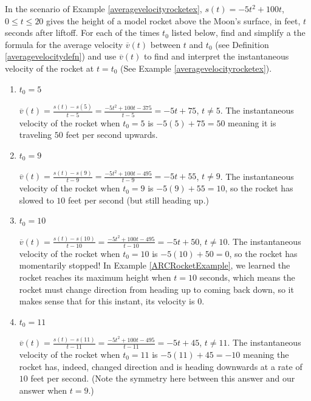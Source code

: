 \documentclass{ximera}
\begin{document}
\begin{problem}
In the scenario of  Example \ref{averagevelocityrocketex}, $s(t) = -5t^2+100t$, $0 \leq t \leq 20$ gives the height of a model rocket above the Moon's surface, in feet,  $t$ seconds after liftoff.  For each of the times $t_{0}$ listed below, find and simplify a the formula for the average velocity $\overline{v}(t)$ between $t$ and $t_{0}$ (see Definition \ref{averagevelocitydefn}) and use $\overline{v}(t)$ to find and interpret the instantaneous velocity of the rocket at $t = t_{0}$ (See Example \ref{averagevelocityrocketex}).

\begin{enumerate}

\item  $t_{0} = 5$

\begin{solution}
    $\overline{v}(t) = \frac{s(t) - s(5)}{t - 5} = \frac{-5t^2+100t-375}{t-5} = -5t+75$, $t \neq 5$.  The instantaneous velocity of the rocket when $t_{0} = 5$ is $-5(5)+75 = 50$ meaning it is traveling $50$ feet per second upwards.
\end{solution}

\item $t_{0} = 9$

\begin{solution}
    $\overline{v}(t) = \frac{s(t) - s(9)}{t - 9} = \frac{-5t^2+100t-495}{t-9} = -5t+55$, $t \neq 9$.  The instantaneous velocity of the rocket when $t_{0} = 9$ is $-5(9)+55 = 10$, so the rocket has slowed to $10$ feet per second (but still heading up.)
\end{solution}

\item $t_{0} = 10$

\begin{solution}
    $\overline{v}(t) = \frac{s(t) - s(10)}{t - 10} = \frac{-5t^2+100t-495}{t-10} = -5t+50$, $t \neq 10$.  The instantaneous velocity of the rocket when $t_{0} = 10$ is $-5(10)+50 = 0$, so the rocket has momentarily stopped!  In Example \ref{ARCRocketExample}, we learned the rocket reaches its maximum height when $t = 10$ seconds, which means the rocket must change direction from heading up to coming back down, so it makes sense that for this instant, its velocity is $0$.
\end{solution}

\item  $t_{0} = 11$

\begin{solution}
    $\overline{v}(t) = \frac{s(t) - s(11)}{t - 11} = \frac{-5t^2+100t-495}{t-11} = -5t+45$, $t \neq 11$.  The instantaneous velocity of the rocket when $t_{0} = 11$ is $-5(11)+45 = -10$ meaning the rocket has, indeed, changed direction and is heading downwards at a rate of $10$ feet per second.  (Note the symmetry here between this answer and our answer when $t=9$.)
\end{solution}

\end{enumerate}
\end{problem}
\end{document}
